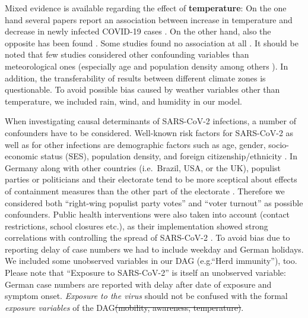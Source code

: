 \documentclass[10pt,letterpaper]{article}
\providecommand{\DIFaddtex}[1]{{\protect\color{blue}\uwave{#1}}} %
\providecommand{\DIFdeltex}[1]{{\protect\color{red}\sout{#1}}}                      %
\providecommand{\DIFaddbegin}{} %
\providecommand{\DIFaddend}{} %
\providecommand{\DIFdelbegin}{} %
\providecommand{\DIFdelend}{} %
\providecommand{\DIFadd}[1]{\texorpdfstring{\DIFaddtex{#1}}{#1}} %
\providecommand{\DIFdel}[1]{\texorpdfstring{\DIFdeltex{#1}}{}} %
\newcommand{\DIFscaledelfig}{0.5}
\newlength{\DIFdelgraphicswidth} %
\newlength{\DIFdelgraphicsheight} %
\newcommand{\DIFaddincludegraphics}[2][]{{\color{blue}\fbox{\DIFOincludegraphics[#1]{#2}}}} %
\newcommand{\DIFdelincludegraphics}[2][]{%
\sbox{\DIFdelgraphicsbox}{\DIFOincludegraphics[#1]{#2}}%
\settoboxwidth{\DIFdelgraphicswidth}{\DIFdelgraphicsbox} %
\settoboxtotalheight{\DIFdelgraphicsheight}{\DIFdelgraphicsbox} %
\scalebox{\DIFscaledelfig}{%
\parbox[b]{\DIFdelgraphicswidth}{\usebox{\DIFdelgraphicsbox}\\[-\baselineskip] \rule{\DIFdelgraphicswidth}{0em}}\llap{\resizebox{\DIFdelgraphicswidth}{\DIFdelgraphicsheight}{%
\setlength{\unitlength}{\DIFdelgraphicswidth}%
\begin{picture}(1,1)%
\thicklines\linethickness{2pt} %
{\color[rgb]{1,0,0}\put(0,0){\framebox(1,1){}}}%
{\color[rgb]{1,0,0}\put(0,0){\line( 1,1){1}}}%
{\color[rgb]{1,0,0}\put(0,1){\line(1,-1){1}}}%
\end{picture}%
}\hspace*{3pt}}} %
} %
\DeclareRobustCommand{\DIFaddbegin}{\DIFOaddbegin \let\includegraphics\DIFaddincludegraphics} %
\DeclareRobustCommand{\DIFaddend}{\DIFOaddend \let\includegraphics\DIFOincludegraphics} %
\DeclareRobustCommand{\DIFdelbegin}{\DIFOdelbegin \let\includegraphics\DIFdelincludegraphics} %
\DeclareRobustCommand{\DIFdelend}{\DIFOaddend \let\includegraphics\DIFOincludegraphics} %
\begin{document}
Mixed evidence is available regarding the effect of
\textbf{temperature}: On the one hand several papers report an
association between increase in temperature and decrease in newly
infected COVID-19 cases
\cite{bannister-tyrrell_preliminary_2020, demongeot_temperature_2020, liu_impact_2020, qi_covid-19_2020, shi_impact_2020, sobral_association_2020, tosepu_correlation_2020, Wang2020temperature, wu_effects_2020}.
On the other hand, also the opposite has been found
\cite{auler_evidence_2020, xie_association_2020}. Some studies found no
association at all
\cite{briz-redon_spatio-temporal_2020, iqbal_nexus_2020, jahangiri_sensitivity_2020, juni_impact_2020, yao_no_2020}.
It should be noted that few studies considered other confounding
variables than meteorological ones (especially age and population
density among others
\cite{briz-redon_spatio-temporal_2020, juni_impact_2020, wu_effects_2020}).
In addition, the transferability of results between different climate
zones is questionable. To avoid possible bias caused by weather
variables other than temperature, we included rain, wind, and humidity
in our model.

When investigating causal determinants of SARS-CoV-2 infections, a
number of confounders have to be considered. Well-known risk factors for
SARS-CoV-2 as well as for other infections are demographic factors such
as age, gender, socio-economic status (SES), population density, and
foreign citizenship/ethnicity
\cite{de2020risk, Dragano2020.06.17.20133918, jhucovid19db2020}. In
Germany along with other countries (i.e.~Brazil, USA, or the UK),
populist parties or politicians and their electorate tend to be more
sceptical about effects of containment measures than the other part of
the electorate \cite{dohle_wingen_schreiber_2020, engle_staying_2020}.
Therefore we considered both ``right-wing populist party votes'' and
``voter turnout'' as possible confounders. Public health interventions
were also taken into account (contact restrictions, school closures
etc.), as their implementation showed strong correlations with
controlling the spread of SARS-CoV-2
\cite{cowling2020impact, juni_impact_2020, lai_effect_2020}. To avoid
bias due to reporting delay of case numbers we had to include weekday
and German holidays. We included some unobserved variables in our DAG
(e.g.\DIFaddbegin \DIFadd{~}\DIFaddend ``Herd immunity''), too. Please note that ``Exposure to
SARS-CoV-2'' is itself an unobserved variable: German case numbers are
reported with delay after date of exposure and symptom onset.
\emph{Exposure to the virus} should not be confused with the formal
\emph{exposure variables} of the DAG\DIFdelbegin \DIFdel{(mobility, awareness, temperature)}\DIFdelend .
\end{document}
